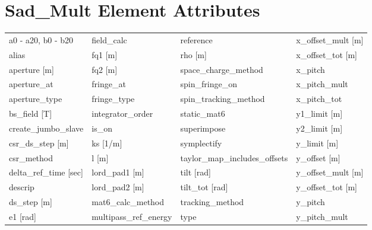  \section{Sad_Mult Element Attributes}
 \label{s:list.sad.mult}
 
 \begin{tabular}{llll} \toprule
a0 - a20, b0 - b20               & field_calc                       & reference                        & x_offset_mult [m]                \\
alias                            & fq1 [m]                          & rho [m]                          & x_offset_tot [m]                 \\
aperture [m]                     & fq2 [m]                          & space_charge_method              & x_pitch                          \\
aperture_at                      & fringe_at                        & spin_fringe_on                   & x_pitch_mult                     \\
aperture_type                    & fringe_type                      & spin_tracking_method             & x_pitch_tot                      \\
bs_field [T]                     & integrator_order                 & static_mat6                      & y1_limit [m]                     \\
create_jumbo_slave               & is_on                            & superimpose                      & y2_limit [m]                     \\
csr_ds_step [m]                  & ks [1/m]                         & symplectify                      & y_limit [m]                      \\
csr_method                       & l [m]                            & taylor_map_includes_offsets      & y_offset [m]                     \\
delta_ref_time [sec]             & lord_pad1 [m]                    & tilt [rad]                       & y_offset_mult [m]                \\
descrip                          & lord_pad2 [m]                    & tilt_tot [rad]                   & y_offset_tot [m]                 \\
ds_step [m]                      & mat6_calc_method                 & tracking_method                  & y_pitch                          \\
e1 [rad]                         & multipass_ref_energy             & type                             & y_pitch_mult                     \\

\end{tabular}
